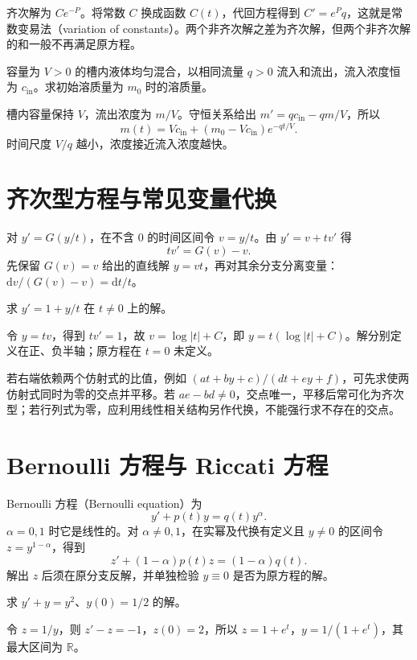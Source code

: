 齐次解为 $Ce^{-P}$。将常数 $C$ 换成函数 $C(t)$，代回方程得到 $C'=e^Pq$，这就是常数变易法（variation of constants）。两个非齐次解之差为齐次解，但两个非齐次解的和一般不再满足原方程。

\begin{example}[混合槽]
容量为 $V>0$ 的槽内液体均匀混合，以相同流量 $q>0$ 流入和流出，流入浓度恒为 $c_{\mathrm{in}}$。求初始溶质量为 $m_0$ 时的溶质量。
\end{example}
\begin{solve}
槽内容量保持 $V$，流出浓度为 $m/V$。守恒关系给出 $m'=qc_{\mathrm{in}}-qm/V$，所以
\[
 m(t)=Vc_{\mathrm{in}}+(m_0-Vc_{\mathrm{in}})e^{-qt/V}.
\]
时间尺度 $V/q$ 越小，浓度接近流入浓度越快。
\end{solve}

\section{齐次型方程与常见变量代换}
对 $y'=G(y/t)$，在不含 $0$ 的时间区间令 $v=y/t$。由 $y'=v+tv'$ 得
\[
 tv'=G(v)-v.
\]
先保留 $G(v)=v$ 给出的直线解 $y=vt$，再对其余分支分离变量：$\mathrm dv/(G(v)-v)=\mathrm dt/t$。

\begin{example}
求 $y'=1+y/t$ 在 $t\ne0$ 上的解。
\end{example}
\begin{solve}
令 $y=tv$，得到 $tv'=1$，故 $v=\log|t|+C$，即 $y=t(\log|t|+C)$。解分别定义在正、负半轴；原方程在 $t=0$ 未定义。
\end{solve}

若右端依赖两个仿射式的比值，例如 $(at+by+c)/(dt+ey+f)$，可先求使两仿射式同时为零的交点并平移。若 $ae-bd\ne0$，交点唯一，平移后常可化为齐次型；若行列式为零，应利用线性相关结构另作代换，不能强行求不存在的交点。

\section{Bernoulli 方程与 Riccati 方程}
Bernoulli 方程（Bernoulli equation）为
\[
 y'+p(t)y=q(t)y^\alpha.
\]
$\alpha=0,1$ 时它是线性的。对 $\alpha\ne0,1$，在实幂及代换有定义且 $y\ne0$ 的区间令 $z=y^{1-\alpha}$，得到
\[
 z'+(1-\alpha)p(t)z=(1-\alpha)q(t).
\]
解出 $z$ 后须在原分支反解，并单独检验 $y\equiv0$ 是否为原方程的解。

\begin{example}
求 $y'+y=y^2$、$y(0)=1/2$ 的解。
\end{example}
\begin{solve}
令 $z=1/y$，则 $z'-z=-1$，$z(0)=2$，所以 $z=1+e^t$，$y=1/(1+e^t)$，其最大区间为 $\mathbb R$。
\end{solve}

